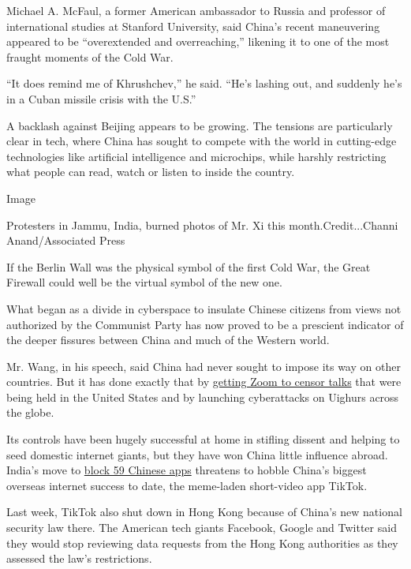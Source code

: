 Michael A. McFaul, a former American ambassador to Russia and professor
of international studies at Stanford University, said China's recent
maneuvering appeared to be ``overextended and overreaching,'' likening
it to one of the most fraught moments of the Cold War.

``It does remind me of Khrushchev,'' he said. ``He's lashing out, and
suddenly he's in a Cuban missile crisis with the U.S.''

A backlash against Beijing appears to be growing. The tensions are
particularly clear in tech, where China has sought to compete with the
world in cutting-edge technologies like artificial intelligence and
microchips, while harshly restricting what people can read, watch or
listen to inside the country.

Image

Protesters in Jammu, India, burned photos of Mr. Xi this
month.Credit...Channi Anand/Associated Press

If the Berlin Wall was the physical symbol of the first Cold War, the
Great Firewall could well be the virtual symbol of the new one.

What began as a divide in cyberspace to insulate Chinese citizens from
views not authorized by the Communist Party has now proved to be a
prescient indicator of the deeper fissures between China and much of the
Western world.

Mr. Wang, in his speech, said China had never sought to impose its way
on other countries. But it has done exactly that by
\href{https://www.nytimes.com/2020/06/11/technology/zoom-china-tiananmen-square.html}{getting
Zoom to censor talks} that were being held in the United States and by
launching cyberattacks on Uighurs across the globe.

Its controls have been hugely successful at home in stifling dissent and
helping to seed domestic internet giants, but they have won China little
influence abroad. India's move to
\href{https://www.nytimes.com/2020/06/29/world/asia/tik-tok-banned-india-china.html?searchResultPosition=1}{block
59 Chinese apps} threatens to hobble China's biggest overseas internet
success to date, the meme-laden short-video app TikTok.

Last week, TikTok also shut down in Hong Kong because of China's new
national security law there. The American tech giants Facebook, Google
and Twitter said they would stop reviewing data requests from the Hong
Kong authorities as they assessed the law's restrictions.

